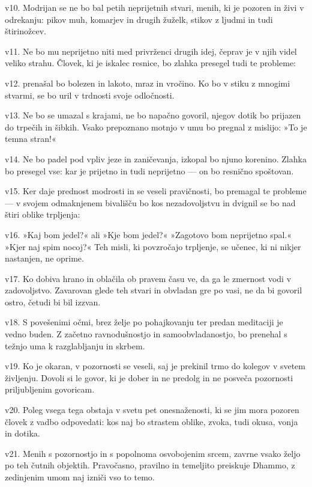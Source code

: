 v10. Modrijan se ne bo bal petih neprijetnih stvari, menih, ki je pozoren in živi v odrekanju: pikov muh, komarjev in drugih žuželk, stikov z ljudmi in tudi štirinožcev.

v11. Ne bo mu neprijetno niti med privrženci drugih idej, čeprav je v njih videl veliko strahu. Človek, ki je iskalec resnice, bo zlahka presegel tudi te probleme:

v12. prenašal bo bolezen in lakoto, mraz in vročino. Ko bo v stiku z mnogimi stvarmi, se bo uril v trdnosti svoje odločnosti.

v13. Ne bo se umazal s krajami, ne bo napačno govoril, njegov dotik bo prijazen do trpečih in šibkih. Vsako prepoznano motnjo v umu bo pregnal z mislijo: »To je temna stran!«

v14. Ne bo padel pod vpliv jeze in zaničevanja, izkopal bo njuno korenino. Zlahka bo presegel vse: kar je prijetno in tudi neprijetno --- on bo resnično spoštovan.

v15. Ker daje prednost modrosti in se veseli pravičnosti, bo premagal te probleme --- v svojem odmaknjenem bivališču bo kos nezadovoljstvu in dvignil se bo nad štiri oblike trpljenja:

v16. »Kaj bom jedel?« ali »Kje bom jedel?« »Zagotovo bom neprijetno spal.« »Kjer naj spim nocoj?« Teh misli, ki povzročajo trpljenje, se učenec, ki ni nikjer nastanjen, ne oprime.

v17. Ko dobiva hrano in oblačila ob pravem času ve, da ga le zmernost vodi v zadovoljstvo. Zavarovan glede teh stvari in obvladan gre po vasi, ne da bi govoril ostro, četudi bi bil izzvan.

v18. S povešenimi očmi, brez želje po pohajkovanju ter predan meditaciji je vedno buden. Z začetno ravnodušnostjo in samoobvladanostjo, bo prenehal s težnjo uma k razglabljanju in skrbem.

v19. Ko je okaran, v pozornosti se veseli, saj je prekinil trmo do kolegov v svetem življenju. Dovoli si le govor, ki je dober in ne predolg in ne posveča pozornosti priljubljenim govoricam.

v20. Poleg vsega tega obstaja v svetu pet onesnaženosti, ki se jim mora pozoren človek z vadbo odpovedati: kos naj bo strastem oblike, zvoka, tudi okusa, vonja in dotika.

v21. Menih s pozornostjo in s popolnoma osvobojenim srcem, zavrne vsako željo po teh čutnih objektih. Pravočasno, pravilno in temeljito preiskuje Dhammo, z zedinjenim umom naj izniči vso to temo.
